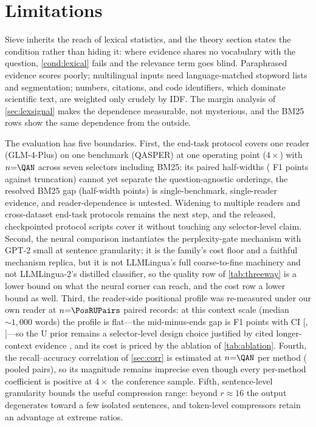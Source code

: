 \documentclass[pdflatex,sn-basic]{sn-jnl}
\theoremstyle{remark}
\newcommand{\method}{Sieve}
\begin{document}
\section{Limitations}
\label{sec:limitations}
\method{} inherits the reach of lexical statistics, and the theory
section states the condition rather than hiding it: where evidence
shares no vocabulary with the question, \autoref{cond:lexical} fails
and the relevance term goes blind. Paraphrased evidence scores poorly;
multilingual inputs need language-matched stopword lists and
segmentation; numbers, citations, and code identifiers, which
dominate scientific text, are weighted only crudely by IDF. The
margin analysis of \autoref{sec:lexsignal} makes the dependence
measurable, not mysterious, and the BM25 rows show the same
dependence from the outside.

The evaluation has five boundaries. First, the end-task protocol
covers one reader (GLM-4-Plus) on one benchmark (QASPER) at one
operating point ($4\times$) with $n{=}\QAN$ across seven selectors
including BM25: its paired half-widths (\QAPairSHHW{} F1 points
against truncation) cannot yet separate the question-agnostic
orderings, the resolved BM25 gap (half-width \QAPairSBmHW{} points)
is single-benchmark, single-reader evidence, and reader-dependence is
untested. Widening to multiple readers and cross-dataset end-task
protocols remains the next step, and the released, checkpointed
protocol scripts cover it without touching any selector-level claim. Second, the
neural comparison instantiates the perplexity-gate mechanism with
GPT-2 small at sentence granularity; it is the family's cost floor
and a faithful mechanism replica, but it is not LLMLingua's full
coarse-to-fine machinery and not LLMLingua-2's distilled classifier,
so the quality row of \autoref{tab:threeway} is a lower bound on what
the neural corner can reach, and the cost row a lower bound as well.
Third, the reader-side positional profile was re-measured under our
own reader at $n{=}\PosRUPairs$ paired records: at this context
scale (median ${\sim}1{,}000$ words) the profile is flat---the
mid-minus-ends gap is \PosRUGap{} F1 points with CI
[\PosRUGapLo, \PosRUGapHi]---so the U prior remains a
selector-level design choice justified by cited longer-context
evidence \citep{liu2023lost}, and its cost is priced by the
ablation of \autoref{tab:ablation}. Fourth, the
recall--accuracy correlation of \autoref{sec:corr} is estimated at
$n{=}\QAN$ per method (\CorrNPairs{} pooled pairs), so its magnitude
remains imprecise even though every per-method coefficient is
positive at $4\times$ the conference sample. Fifth, sentence-level
granularity bounds the useful compression range: beyond
$r \approx 16$ the output degenerates toward a few isolated
sentences, and token-level compressors retain an advantage at extreme
ratios.
\end{document}
